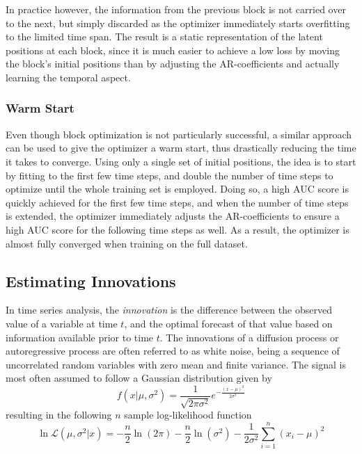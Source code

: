         In practice however, the information from the previous block is not carried over to the next, but simply discarded as the optimizer immediately starts overfitting to the limited time span. The result is a static representation of the latent positions at each block, since it is much easier to achieve a low loss by moving the block's initial positions than by adjusting the AR-coefficients and actually learning the temporal aspect.
        
    \subsubsection{Warm Start}
    
        Even though block optimization is not particularly successful, a similar approach can be used to give the optimizer a warm start, thus drastically reducing the time it takes to converge. Using only a single set of initial positions, the idea is to start by fitting to the first few time steps, and double the number of time steps to optimize until the whole training set is employed. Doing so, a high AUC score is quickly achieved for the first few time steps, and when the number of time steps is extended, the optimizer immediately adjusts the AR-coefficients to ensure a high AUC score for the following time steps as well. As a result, the optimizer is almost fully converged when training on the full dataset.
    
\subsection{Estimating Innovations}

    In time series analysis, the \emph{innovation} is the difference between the observed value of a variable at time $t$, and the optimal forecast of that value based on information available prior to time $t$. The innovations of a diffusion process or autoregressive process are often referred to as white noise, being a sequence of uncorrelated random variables with zero mean and finite variance. The signal is most often assumed to follow a Gaussian distribution given by
    \begin{equation}
        f(x\vert\mu,\sigma^2) = \frac{1}{\sqrt{2\pi\sigma^2}}e^{-\frac{(x-\mu)^2}{2\sigma^2}}
    \end{equation}
    resulting in the following $n$ sample log-likelihood function
    \begin{equation}
        \ln\mathcal{L}(\mu, \sigma^2\vert x) = -\frac{n}{2}\ln(2\pi) - \frac{n}{2}\ln(\sigma^2) - \frac{1}{2\sigma^2}\sum_{i=1}^n (x_i - \mu)^2
    \end{equation}
    
